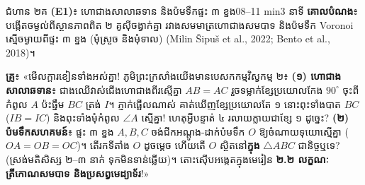 \documentclass[a4paper,12pt]{article}
\newcommand{\en}[1]{{\TimesEn #1}}
\newcommand{\enbf}[1]{{\TimesEn\textbf{#1}}}
\newcommand{\tri}[1]{\ensuremath{\triangle #1}}
\newcommand{\ang}[1]{\ensuremath{\angle #1}}
\begin{document}
\Needspace{2.0cm}
\begin{phasebox}{ជំហាន ២គ \enbf{(E1)}៖ ហោជាងសាលាឆទាន និងប៉មទឹកផ្ទះ ៣ ខ្នង}{08--11 min}{3 នាទី}
\textbf{គោលបំណង}៖ បង្កើតចម្ងល់ពីស្ថានភាពពិត ២ គូស៊ីចង្វាក់គ្នា រវាងសមមាត្រហោជាងសមបាទ និងប៉មទឹក \en{Voronoi} ស្មើចម្ងាយពីផ្ទះ ៣ ខ្នង (មុំស្រួច និងមុំទាល) \en{(Milin Šipuš et al., 2022; Bento et al., 2018)}។
\end{phasebox}
\begin{scriptbox}
  \textbf{គ្រូ}៖ «មើលក្ដារខៀនទាំងអស់គ្នា! ភូមិព្រះក្រសាំងយើងមានបេសកកម្មវិស្វកម្ម ២៖ \textbf{(១) ហោជាងសាលាឆទាន}៖ ជាងឈើវាស់ជើងហោជាងពីរស្មើគ្នា $AB=AC$ រួចទម្លាក់ខ្សែប្រយោលកែង $90^\circ$ ចុះពីកំពូល $A$ ប៉ះធ្នឹម $BC$ ត្រង់ $I$។ ភ្ញាក់ផ្អើលណាស់ គាត់ឃើញខ្សែប្រយោលតែ ១ នោះពុះទាំងបាត $BC$ ($IB=IC$) និងពុះទាំងមុំកំពូល $\ang{A}$ ស្មើគ្នា! ហេតុអ្វីបន្ទាត់ ៤ រលាយក្លាយជាខ្សែ ១ ដូច្នេះ? \textbf{(២) ប៉មទឹកសហគមន៍}៖ ផ្ទះ ៣ ខ្នង $A, B, C$ ចង់ជីកអណ្ដូង-ដាក់ប៉មទឹក $O$ ឱ្យចំណាយទុយោស្មើគ្នា ($OA=OB=OC$)។ តើរកទីតាំង $O$ ដូចម្ដេច ហើយតើ $O$ ស្ថិតនៅ\textbf{ក្នុង} $\tri{ABC}$ ជានិច្ចឬទេ? (ស្រង់មតិសិស្ស ២--៣ នាក់ ទុកមិនទាន់ឆ្លើយ)។ តោះស៊ើបអង្កេតក្នុងមេរៀន \textbf{២.២ លក្ខណៈត្រីកោណសមបាទ និងប្រសព្វមេដ្យាទ័រ}!»
\end{scriptbox}
\end{document}
